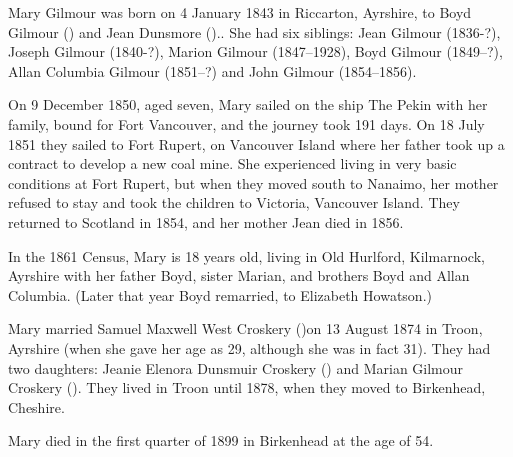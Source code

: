 
Mary Gilmour was born on 4 January 1843 in	Riccarton, Ayrshire, to Boyd Gilmour () and Jean Dunsmore ().\cite{MGilmourBirth}. She had six siblings: Jean Gilmour (1836-?), Joseph Gilmour (1840-?),
Marion Gilmour (1847--1928), Boyd Gilmour (1849--?), Allan Columbia Gilmour (1851--?) and John Gilmour (1854--1856).

On 9 December 1850, aged seven,  Mary  sailed on the ship The Pekin with her family, bound for Fort Vancouver, and the journey took 191 days. On 18 July 1851 they sailed to Fort Rupert, on Vancouver Island where her father took up a contract to develop a new coal mine.  She experienced living in very basic conditions at Fort Rupert, but when they moved south to Nanaimo, her mother refused to stay and took the children to Victoria, Vancouver Island. They returned to Scotland in 1854, and her mother Jean died in 1856.

In the 1861 Census, Mary is 18 years old, living in Old Hurlford, Kilmarnock, Ayrshire  with her father Boyd, sister Marian, and brothers Boyd and Allan Columbia. (Later that year Boyd remarried, to Elizabeth Howatson.)

Mary  married Samuel Maxwell West Croskery ()on 13 August 1874 in Troon, Ayrshire (when she gave her age as 29, although she was in fact 31).\cite{SMWC-MG-marriage}  They had two daughters:  Jeanie Elenora Dunsmuir Croskery () and Marian Gilmour Croskery ().  They lived in Troon until 1878, when they moved to Birkenhead, Cheshire.

Mary died in the first quarter of 1899 in Birkenhead at the age of 54. \cite{MGilmourDeath} 
